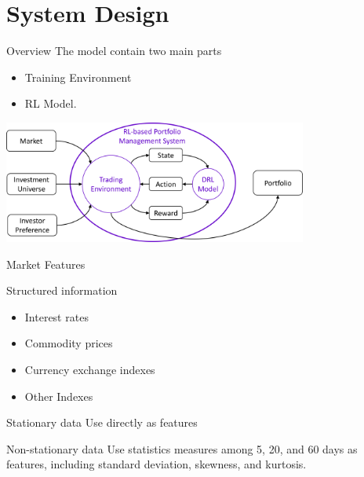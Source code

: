 \section{System Design}
\begin{frame}{Overview}
The model contain two main parts
\begin{itemize}
    \item Training Environment
    \item RL Model. 
\end{itemize}
\begin{center}
  \includegraphics[width=10cm]{images/context_diagram.png}  
\end{center}
\end{frame}




\begin{frame}{Market Features}
\begin{block}{Structured information}
\begin{itemize}
    \item Interest rates
    \item Commodity prices
    \item Currency exchange indexes
    \item Other Indexes
\end{itemize}
\end{block}
\begin{block}{Stationary data}
   Use directly as features
\end{block}
\begin{block}{Non-stationary data}
    Use statistics measures among 5, 20, and 60 days as features, including standard deviation, skewness, and kurtosis.
\end{block}
\end{frame}

